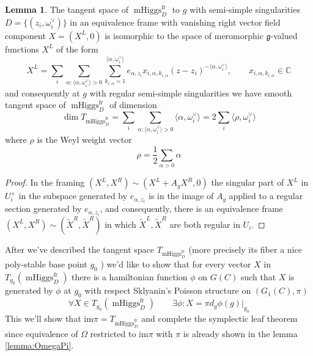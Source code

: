 \documentclass[11pt, oneside, reqno]{amsart}
\theoremstyle{definition} \newtheorem{definition}{Definition}[section]
\newtheorem{lemma}[definition]{Lemma}
\theoremstyle{definition} \newtheorem{remark}[definition]{Remark}
\theoremstyle{definition} \newtheorem{remarks}[definition]{Remarks}
\theoremstyle{definition} \newtheorem{question}[definition]{Question}
\theoremstyle{definition} \newtheorem*{note}{Note}
\theoremstyle{definition} \newtheorem{example}[definition]{Example}
\theoremstyle{definition} \newtheorem{examples}[definition]{Examples}
\renewcommand{\gg}{\mathfrak{g}}
\DeclareMathOperator{\mhiggs}{mHiggs}
\newcommand{\fr}{\mathrm{fr}}
\begin{document}
\begin{lemma}
  The tangent space of $\mhiggs^{\fr}_{D}$ to $g$ with semi-simple singularities 
  $D = \{(z_i, \omega^{\vee}_{i})\}$ in an equivalence frame with
  vanishing right vector field component $X = (X^{L}, 0)$ is isomorphic to the
  space of meromorphic $\gg$-valued functions $X^{L}$ of the form
  \begin{equation}
\label{eq:XL}
    X^{L} = \sum_{i} \sum_{\alpha: \langle \alpha, \omega_i^{\vee} \rangle > 0 }
    \sum_{k_{i, \alpha} = 1}^{ \langle \alpha , \omega_i^{\vee} \rangle} e_{\alpha,{z_i}} x_{i, \alpha, k_{i, \alpha}} (z - z_i)^{-\langle \alpha, \omega_i^{\vee}\rangle }, \qquad x_{i, \alpha, k_{i, \alpha}} \in \mathbb{C}
  \end{equation}
  and consequently at $g$ with regular semi-simple singularities we have smooth
  tangent space of $\mhiggs^{\fr}_{D}$ of dimension 
  \begin{equation}
\dim T_{\mhiggs^{\fr}_{D}} = \sum_{i} \sum_{\alpha: \langle \alpha, \omega_i^{\vee} \rangle > 0 } \langle \alpha, \omega_i^{\vee} \rangle = 2 \sum_{i} \langle \rho, \omega^{\vee}_i\rangle 
  \end{equation}
  where $\rho$ is the Weyl weight vector
  \begin{equation}
    \rho = \frac 1 2 \sum_{\alpha > 0} \alpha 
  \end{equation}
\end{lemma}
\begin{proof}
  In the framing $(X^{L}, X^{R}) \sim (X^{L} + A_{g} X^{R}, 0 )$ the singular
  part of $X^{L}$ in $U_{i}^{\times}$ in the subspace generated by $e_{\alpha, z_i}$
  is in the image of $A_{g}$ applied to a regular section generated by $e_{\alpha, z_i}$,
  and consequently, there is an equivalence frame $(X^{L}, X^{R}) \sim (\tilde X^{R}, \tilde X^{R})$   in which $\tilde X^{L}, \tilde X^{R}$ are both regular in $U_{i}$. 
\end{proof}

After we've described the tangent space  $T_{\mhiggs_{D}^{\fr}}$ (more precisely its fiber
a nice poly-stable base point $g_0$ )   we'd like to show that
for every vector $X$ in $T_{g_0}(\mhiggs_{D}^{\fr})$ there is a 
hamiltonian function $\phi$ on $G(C)$ such that $X$ is generated by $\phi$ at $g_0$ with respect Sklyanin's Poisson structure on $(G_1(C), \pi)$
\begin{equation}
  \forall X \in  T_{g_0}( \mhiggs_{D}^{\fr}) \qquad \exists \phi: X  = \pi d_{g}\phi(g) |_{g_0}
\end{equation}
This we'll show that $\mathrm{im} \pi = T_{\mhiggs_{D}^{\fr}}$
and complete the symplectic leaf theorem since equivalence of $\Omega$ restricted to
$\mathrm{im} \pi $ with $\pi$ is already shown in the lemma \ref{lemma:OmegaPi}.
\end{document}
